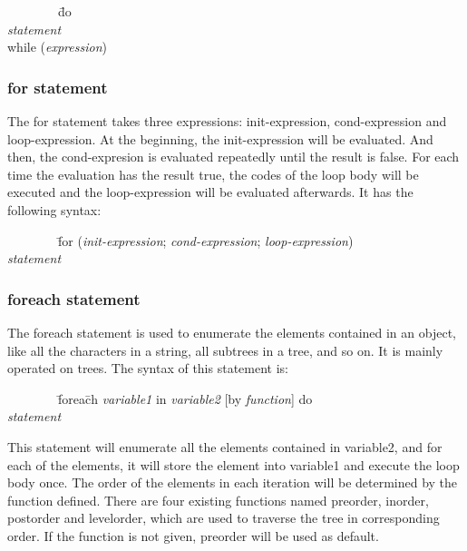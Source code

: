\documentclass[12pt,psfig,a4]{article}
\begin{document}
\begin{code}
\begin{tabbing}
~~~~~~~~\= do \= \\
\> \> \textit{statement} \\
\> while (\textit{expression})
\end{tabbing}
\end{code}

\subsubsection{for statement}
The for statement takes three expressions: init-expression, cond-expression and loop-expression. At the beginning, the init-expression will be evaluated. And then, the cond-expresion is evaluated repeatedly until the result is false. For each time the evaluation has the result true, the codes of the loop body will be executed and the loop-expression will be evaluated afterwards. It has the following syntax:

\begin{code}
\begin{tabbing}
~~~~~~~~\= for (\= \textit{init-expression}; \textit{cond-expression}; \textit{loop-expression}) \\
\> \> \textit{statement}
\end{tabbing}
\end{code}

\subsubsection{foreach statement}
The foreach statement is used to enumerate the elements contained in an object, like all the characters in a string, all subtrees in a tree, and so on. It is mainly operated on trees. The syntax of this statement is:

\begin{code}
\begin{tabbing}
~~~~~~~~\= forea\= ch \textit{variable1} in \textit{variable2} [by \textit{function}] do \\
\> \> \textit{statement}
\end{tabbing}
\end{code}

This statement will enumerate all the elements contained in variable2, and for each of the elements, it will store the element into variable1 and execute the loop body once. The order of the elements in each iteration will be determined by the function defined. There are four existing functions named preorder, inorder, postorder and levelorder, which are used to traverse the tree in corresponding order. If the function is not given, preorder will be used as default.
\end{document}

